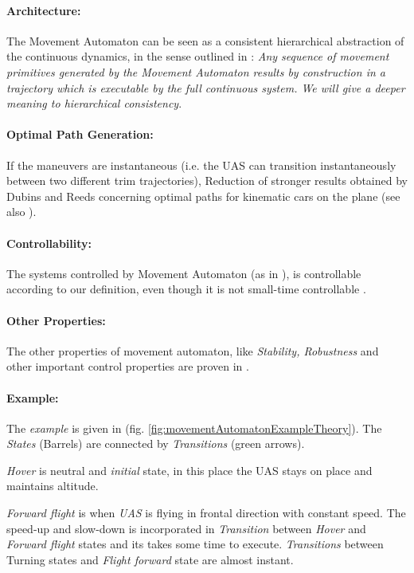 \paragraph{Architecture:} The Movement Automaton can be seen as a consistent hierarchical abstraction of the continuous dynamics, in the sense outlined in \cite{pappas2000hierarchically}: \emph{Any sequence of movement primitives generated by the Movement Automaton results by construction in a trajectory which is executable by the full continuous system. We will give a deeper meaning to hierarchical consistency}. 

\paragraph{Optimal Path Generation:} If the maneuvers are instantaneous (i.e. the UAS can transition instantaneously between two different trim trajectories), Reduction of stronger results obtained by Dubins \cite{dubins1957curves} and Reeds \cite{reeds1990optimal} concerning optimal paths for kinematic cars on the plane (see also \cite{soueres1998optimal}). 

\paragraph{Controllability:} The systems controlled by Movement Automaton (as in \cite{lavalle1998rapidly}), is controllable according to our definition, even though it is not
small-time controllable \cite{sussmann1983lie}.

\paragraph{Other Properties:} The other properties of movement automaton, like \emph{Stability, Robustness} and other important control properties are proven in \cite{frazzoli2001robust}.


\paragraph{Example:} The \emph{example} is given in (fig. \ref{fig:movementAutomatonExampleTheory}). The \emph{States} (Barrels) are connected by \emph{Transitions} (green arrows).

\emph{Hover} is neutral and \emph{initial} state, in this place the UAS stays on place and maintains altitude.

\emph{Forward flight} is when \emph{UAS} is flying in frontal direction with constant speed. The speed-up and slow-down is incorporated in \emph{Transition} between \emph{Hover} and \emph{Forward flight} states and its takes some time to execute. \emph{Transitions} between Turning states and \emph{Flight forward} state are almost instant. 

